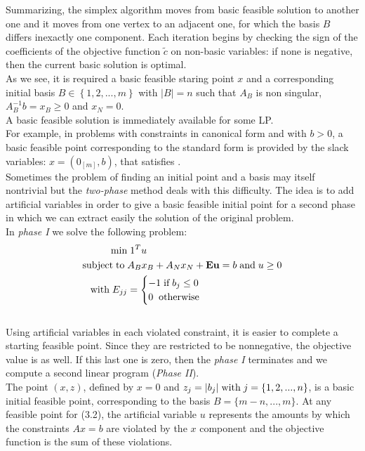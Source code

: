 \documentclass[a4paper,10 pt,titlepage,twoside]{book}
\theoremstyle{plain}
\theoremstyle{definition}
\theoremstyle{remark}
\begin{document}
Summarizing, the simplex algorithm moves from basic feasible solution to another one and it moves from one vertex to an adjacent one, for which the basis $B$ differs inexactly one component. Each iteration begins by checking the sign of the coefficients of the objective function $\widetilde{c}$ on non-basic variables: if none is negative, then the current basic solution is optimal. \\
As we see, it is required a basic feasible staring point $x$ and a corresponding initial basis $B \in \left\{ 1,2,..., m \right\}$ with $|B|=n$ such that $A_{B}$ is non singular, $A_{B}^{-1}b=x_{B} \geq 0$ and $x_{N}=0$.\\
A basic feasible solution is immediately available for some LP.\\ For example, in problems with constraints in canonical form and with $b > 0$, a basic feasible point corresponding to the standard form is provided by the slack variables: $x =\left(0_{[m]},b\right)$, that satisfies .\\Sometimes the problem of finding an initial point and a basis may itself nontrivial but the \textit{two-phase} method deals with this difficulty. The idea is to add artificial variables in order to give a basic feasible initial point for a second phase in which we can extract easily the solution of the original problem.\\
In \textit{phase I} we solve the following problem:
\begin{equation}
\begin{split}
\min &\;1^{T}u\\
\text{subject\;to\;}&A_{B}x_{B}+A_{N}x_{N} + \textbf{Eu} = b\;\text{and\;} u\geq 0\\
\text{with\;} E_{jj}& =\begin{cases} -1\;\text{if\;} b_{j} \leq 0\\
0\;\; \text{otherwise}
\end{cases}   
\end{split}
\end{equation} \\
Using artificial variables in each violated constraint, it is easier to complete a starting feasible point. Since they are restricted to be nonnegative, the objective value is as well. If this last one is zero, then the \textit{phase I} terminates and we compute a second linear program (\textit{Phase II}).\\
The point $(x,z)$, defined by $x = 0$ and $z_{j} = |b_{j}| \text{\;with\;}j =\{1,2,...,n\}$, is a basic initial feasible point, corresponding to the basis $B = \{m-n,...,m\}$. At any feasible point for (3.2), the artificial variable $u$ represents the amounts by which the constraints $Ax = b$ are violated by the $x$ component and the objective function is the sum of these violations. \\
\end{document}
